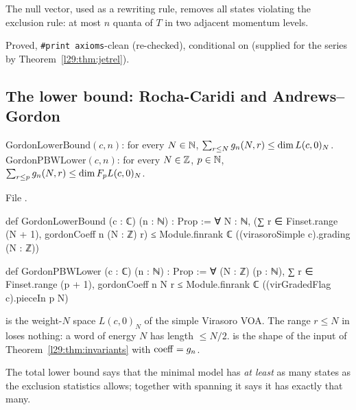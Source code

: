 \begin{physics}
The null vector, used as a rewriting rule, removes all states violating the exclusion rule: at most $n$ quanta of
$T$ in two adjacent momentum levels.
\end{physics}

\begin{status}
Proved, \texttt{\#print axioms}-clean (re-checked), conditional on  (supplied for the series by
Theorem~\ref{l29:thm:jetrel}).
\end{status}

\subsection{The lower bound: Rocha-Caridi and Andrews--Gordon}

\begin{definition}\label{l29:def:gordonlower}
$\mathrm{GordonLowerBound}(c,n)$: for every $N\in{\mathbb{N}}$, $\sum_{r\le N}g_n(N,r)\le\dim L(c,0)_N$.
$\mathrm{GordonPBWLower}(c,n)$: for every $N\in{\mathbb{Z}}$, $p\in{\mathbb{N}}$, $\sum_{r\le p}g_n(N,r)\le\dim F_pL(c,0)_N$.
\end{definition}

\noindent File .
\begin{leancode}
def GordonLowerBound (c : ℂ) (n : ℕ) : Prop :=
  ∀ N : ℕ, (∑ r ∈ Finset.range (N + 1), gordonCoeff n (N : ℤ) r) ≤
    Module.finrank ℂ ((virasoroSimple c).grading (N : ℤ))

def GordonPBWLower (c : ℂ) (n : ℕ) : Prop :=
  ∀ (N : ℤ) (p : ℕ), ∑ r ∈ Finset.range (p + 1), gordonCoeff n N r ≤
    Module.finrank ℂ ((virGradedFlag c).pieceIn p N)
\end{leancode}

\begin{dictionary}
 is the weight-$N$ space $L(c,0)_N$ of the simple Virasoro VOA. The range
$r\le N$ in  loses nothing: a word of energy $N$ has length $\le N/2$.  is
the shape of the input  of Theorem~\ref{l29:thm:invariants} with $\mathrm{coeff}=g_n$.
\end{dictionary}

\begin{physics}
The total lower bound says that the minimal model has \emph{at least} as many states as the exclusion statistics
allows; together with spanning it says it has exactly that many.
\end{physics}

